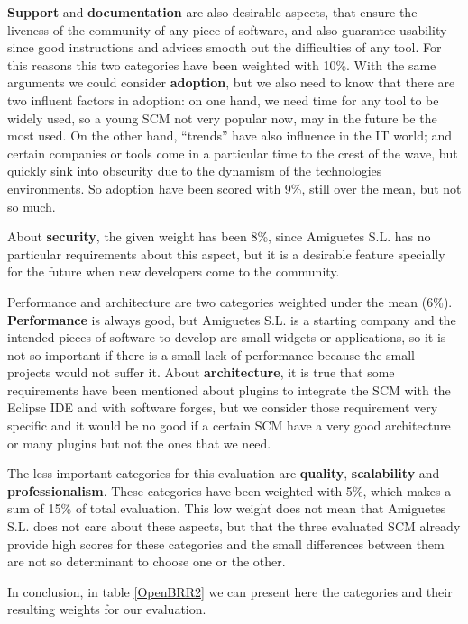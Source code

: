 \documentclass[a4paper,10pt]{article}
\begin{document}
\textbf{Support} and \textbf{documentation} are also desirable aspects, that
ensure the liveness of the community of any piece of software, and also
guarantee usability since good instructions and advices smooth out the
difficulties of any tool. For this reasons this two categories have been
weighted with 10\%. With the same arguments we could consider
\textbf{adoption}, but we also need to know that there are two influent factors
in adoption: on one hand, we need time for any tool to be widely used, so a
young SCM not very popular now, may in the future be the most used. On the
other hand, ``trends'' have also influence in the IT world; and certain
companies or tools come in a particular time to the crest of the wave, but
quickly sink into obscurity due to the dynamism of the technologies
environments. So adoption have been scored with 9\%, still over the mean, but
not so much.


About \textbf{security}, the given weight has been 8\%, since Amiguetes S.L.
has no particular requirements about this aspect, but it is a desirable feature
specially for the future when new developers come to the community.


Performance and architecture are two categories weighted under the mean (6\%).
\textbf{Performance} is always good, but Amiguetes S.L. is a starting company
and the intended pieces of software to develop are small widgets or
applications, so it is not so important if there is a small lack of performance
because the small projects would not suffer it. About \textbf{architecture}, it
is true that some requirements have been mentioned about plugins to integrate
the SCM with the Eclipse IDE and with software forges, but we consider those
requirement very specific and it would be no good if a certain SCM have a very
good architecture or many plugins but not the ones that we need.


The less important categories for this evaluation are \textbf{quality},
\textbf{scalability} and \textbf{professionalism}. These categories have been
weighted with 5\%, which makes a sum of 15\% of total evaluation. This low
weight does not mean that Amiguetes S.L. does not care about these aspects, but
that the three evaluated SCM already provide high scores for these categories
and the small differences between them are not so determinant to choose one or
the other. 


In conclusion, in table \ref{OpenBRR2} we can present here the categories and
their resulting weights for our evaluation.
\end{document}
